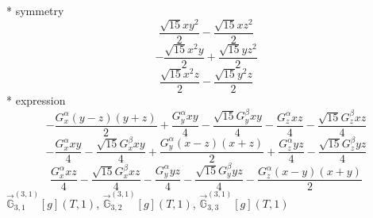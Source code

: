\documentclass[fleqn,8pt]{jsarticle}
\begin{document}
\noindent\quad ** symmetry
\begin{dmath*}
\frac{\sqrt{15} x y^{2}}{2} - \frac{\sqrt{15} x z^{2}}{2}
\end{dmath*}
\begin{dmath*}
- \frac{\sqrt{15} x^{2} y}{2} + \frac{\sqrt{15} y z^{2}}{2}
\end{dmath*}
\begin{dmath*}
\frac{\sqrt{15} x^{2} z}{2} - \frac{\sqrt{15} y^{2} z}{2}
\end{dmath*}
\noindent\quad ** expression
\begin{dmath*}
- \frac{G_{x}^{\alpha} \left(y - z\right) \left(y + z\right)}{2} + \frac{G_{y}^{\alpha} x y}{4} - \frac{\sqrt{15} G_{y}^{\beta} x y}{4} - \frac{G_{z}^{\alpha} x z}{4} - \frac{\sqrt{15} G_{z}^{\beta} x z}{4}
\end{dmath*}
\begin{dmath*}
- \frac{G_{x}^{\alpha} x y}{4} - \frac{\sqrt{15} G_{x}^{\beta} x y}{4} + \frac{G_{y}^{\alpha} \left(x - z\right) \left(x + z\right)}{2} + \frac{G_{z}^{\alpha} y z}{4} - \frac{\sqrt{15} G_{z}^{\beta} y z}{4}
\end{dmath*}
\begin{dmath*}
\frac{G_{x}^{\alpha} x z}{4} - \frac{\sqrt{15} G_{x}^{\beta} x z}{4} - \frac{G_{y}^{\alpha} y z}{4} - \frac{\sqrt{15} G_{y}^{\beta} y z}{4} - \frac{G_{z}^{\alpha} \left(x - y\right) \left(x + y\right)}{2}
\end{dmath*}
\noindent\quad $\vec{\mathbb{G}}_{3,1}^{(3,1)}[g](T,1)$, $\vec{\mathbb{G}}_{3,2}^{(3,1)}[g](T,1)$, $\vec{\mathbb{G}}_{3,3}^{(3,1)}[g](T,1)$
\end{document}
